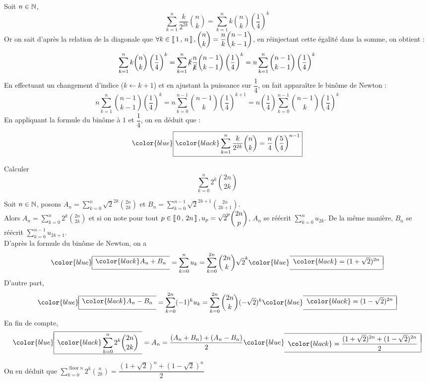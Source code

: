 \documentclass{fancybook}
\newcommand{\lboxed}[1]{{\color{blue}\begin{array}{|l}\hline\\[-2.4ex]{\color{black}#1}\\[1.2ex]\hline\end{array}}}
\newcommand{\rboxed}[1]{{\color{blue}\begin{array}{r|}\hline\\[-2.4ex]{\color{black}#1}\\[1.2ex]\hline\end{array}}}
\newcommand{\lrboxed}[1]{{\color{blue}\boxed{\color{black}#1}}}
\DeclareMathOperator{\floor}{floor}
\begin{document}
\begin{solution}
Soit $n \in \mathbb{N}$,
\[
\displaystyle\sum\limits_{k=1}^{n} \dfrac{k}{2^{2k}}\binom{n}{k} = \displaystyle\sum\limits_{k=1}^{n}k \binom{n}{k} \left(\dfrac{1}{4}\right)^k
\]
Or on sait d'après la relation de la diagonale que $\forall k \in \left\llbracket \, 1 \, , \, n \, \right\rrbracket, \displaystyle\binom{n}{k} = \dfrac{n}{k}\binom{n-1}{k-1}$, en réinjectant cette égalité dans la somme, on obtient :
\[
\displaystyle\sum\limits_{k=1}^{n}k \binom{n}{k} \left(\dfrac{1}{4}\right)^k
=\displaystyle\sum\limits_{k=1}^{n}\cancel{k} \dfrac{n}{\cancel{k}}\binom{n-1}{k-1} \left(\dfrac{1}{4}\right)^k
=n\displaystyle\sum\limits_{k=1}^{n} \binom{n-1}{k-1} \left(\dfrac{1}{4}\right)^k
\]
En effectuant un changement d'indice ($k \leftarrow k+1$) et en ajustant la puissance sur $\dfrac{1}{4}$, on fait apparaître le binôme de Newton :
\[
n\displaystyle\sum\limits_{k=1}^{n} \binom{n-1}{k-1} \left(\dfrac{1}{4}\right)^k 
= n\displaystyle\sum\limits_{k=0}^{n-1} \binom{n-1}{k} \left(\dfrac{1}{4}\right)^{k+1} =  n\left(\dfrac{1}{4}\right)\displaystyle\sum\limits_{k=0}^{n-1} \binom{n-1}{k} \left(\dfrac{1}{4}\right)^{k}
\]
En appliquant la formule du binôme à $1$ et $\dfrac{1}{4}$, on en déduit que :
\[
\lrboxed{\displaystyle\sum\limits_{k=1}^{n} \dfrac{k}{2^{2k}}\binom{n}{k} =\dfrac{n}{4}\left(\dfrac{5}{4}\right)^{n-1}}
\]
\end{solution}

\begin{exercice}
Calculer 
\[
\displaystyle\sum\limits_{k=0}^{n} 2^k \binom{2n}{2k}
\]
\end{exercice}

\begin{solution}
Soit $n \in \mathbb{N}$, posons $A_n = \displaystyle\sum\limits_{k=0}^{n} \sqrt{2}^{2k} \binom{2n}{2k}$ et $B_n = \displaystyle\sum\limits_{k=0}^{n-1} \sqrt{2}^{2k+1}  \binom{2n}{2k+1}$.\\
Alors $A_n = \displaystyle\sum\limits_{k=0}^{n} 2^k \binom{2n}{2k}$ et si on note pour tout $ p \in \left\llbracket \, 0 \, , \, 2n \, \right\rrbracket, u_p = \sqrt{2}^{p} \displaystyle\binom{2n}{p}$, $A_n$ se réécrit $\displaystyle\sum\limits_{k=0}^{n} u_{2k}$. De la même manière, $B_n$ se réécrit $\displaystyle\sum\limits_{k=0}^{n-1} u_{2k+1}$.\\
D'après la formule du binôme de Newton, on a
\[
\lboxed{A_n + B_n} 
= \displaystyle\sum\limits_{k=0}^{n} u_{k} 
= \displaystyle\sum\limits_{k=0}^{2n}\binom{2n}{k} \sqrt{2}^k 
\rboxed{= (1+\sqrt{2})^{2n}} 
\]
D'autre part,  
\[
\lboxed{A_n - B_n}
= \displaystyle\sum\limits_{k=0}^{2n} (-1)^k u_{k} 
= \displaystyle\sum\limits_{k=0}^{2n} \binom{2n}{k}  (-\sqrt{2})^k 
\rboxed{= (1-\sqrt{2})^{2n}}
\]
En fin de compte,  
\[
\lboxed{\displaystyle\sum\limits_{k=0}^{n} 2^k \binom{2n}{2k}}
= A_n 
= \dfrac{(A_n+B_n) + (A_n - B_n)}{2} 
\rboxed{= \dfrac{(1+\sqrt{2})^{2n}+(1-\sqrt{2})^{2n}}{2}}
\]

On en déduit que \hfil$\displaystyle\sum\limits_{k=0}^{\floor{n}} 2^k \binom{n}{2k} = \dfrac{(1+\sqrt{2})^{n}+(1-\sqrt{2})^{n}}{2}$
\end{solution}
\end{document}
